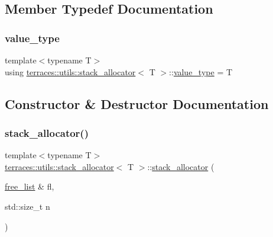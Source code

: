 \subsection{Member Typedef Documentation}
\mbox{\label{classterraces_1_1utils_1_1stack__allocator_a1c3fa04869c7fe9730a18b046461cbbb}} 
\subsubsection{\texorpdfstring{value\+\_\+type}{value\_type}}
{\footnotesize\ttfamily template$<$typename T$>$ \\
using \hyperlink{classterraces_1_1utils_1_1stack__allocator}{terraces\+::utils\+::stack\+\_\+allocator}$<$ T $>$\+::\hyperlink{classterraces_1_1utils_1_1stack__allocator_a1c3fa04869c7fe9730a18b046461cbbb}{value\+\_\+type} =  T}



\subsection{Constructor \& Destructor Documentation}
\mbox{\label{classterraces_1_1utils_1_1stack__allocator_a557138c2f8f21847dbbfbdc588909f68}} 
\subsubsection{\texorpdfstring{stack\+\_\+allocator()}{stack\_allocator()}\hspace{0.1cm}{\footnotesize\ttfamily [1/2]}}
{\footnotesize\ttfamily template$<$typename T$>$ \\
\hyperlink{classterraces_1_1utils_1_1stack__allocator}{terraces\+::utils\+::stack\+\_\+allocator}$<$ T $>$\+::\hyperlink{classterraces_1_1utils_1_1stack__allocator}{stack\+\_\+allocator} (\begin{DoxyParamCaption}\item[{\hyperlink{classterraces_1_1utils_1_1free__list}{free\+\_\+list} \&}]{fl,  }\item[{std\+::size\+\_\+t}]{n }\end{DoxyParamCaption})\hspace{0.3cm}{\ttfamily [inline]}}

